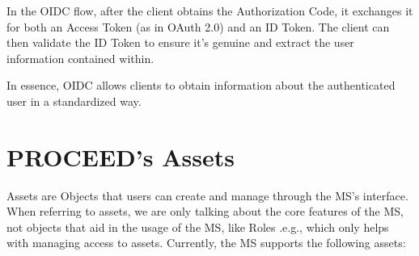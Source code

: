%

In the OIDC flow, after the client obtains the Authorization Code,
it exchanges it for both an Access Token (as in OAuth 2.0) and an ID Token.
The client can then validate the ID Token to ensure it's genuine and extract the user information contained within.


%


In essence, OIDC allows clients to obtain information about the authenticated user in a standardized way.

\section{PROCEED's Assets}
\label{cha:relatedwork:proceed-assets}

Assets are Objects that users can create and manage through the MS's interface.
When referring to assets, we are only talking about the core features of the MS, not
objects that aid in the usage of the MS, like Roles .e.g., which only helps with managing
access to assets.
Currently, the MS supports the following assets:

